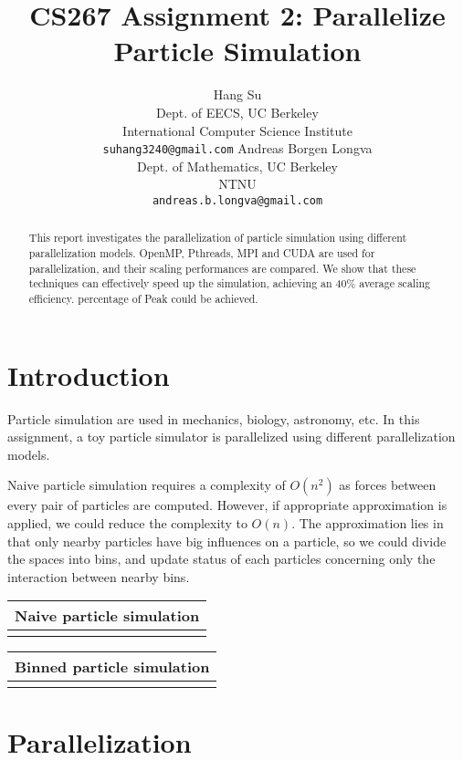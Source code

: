 \documentclass[11pt]{article}
\title{CS267 Assignment 2: Parallelize Particle Simulation}
\author{Hang Su \\
  Dept. of EECS, UC Berkeley \\
  International Computer Science Institute \\
  {\tt suhang3240@gmail.com}
  \And
  Andreas Borgen Longva \\
  Dept. of Mathematics, UC Berkeley \\
  NTNU \\
  {\tt andreas.b.longva@gmail.com}
}
\date{}
\begin{document}
\maketitle
\vspace{-8mm}
\begin{abstract}
This report investigates the parallelization of particle simulation using different parallelization models.
OpenMP, Pthreads, MPI and CUDA are used for parallelization, and their scaling performances are compared.
We show that these techniques can effectively speed up the simulation, achieving an 40\% average scaling efficiency.
percentage of Peak could be achieved.
\end{abstract}

\section{Introduction}
Particle simulation are used in mechanics, biology, astronomy, etc. In this assignment, a toy particle simulator is
parallelized using different parallelization models.

Naive particle simulation requires a complexity of $O(n^2)$ as forces between every pair of particles are computed.
However, if appropriate approximation is applied, we could reduce the complexity to $O(n)$. The approximation lies in
that only nearby particles have big influences on a particle, so we could divide the spaces into bins, and 
update status of each particles concerning only the interaction between nearby bins.

\begin{table}[htb]
  \centering
  \begin{tabular}{l}
    \hline
      Naive particle simulation\\
    \hline
      \\
    \hline
  \end{tabular}
  \label{tab:naive}
\end{table}

\begin{table}[htb]
  \centering
  \begin{tabular}{l}
    \hline
      Binned particle simulation\\
    \hline
      \\
    \hline
  \end{tabular}
  \label{tab:serial}
\end{table}

\section{Parallelization}
\end{document}
